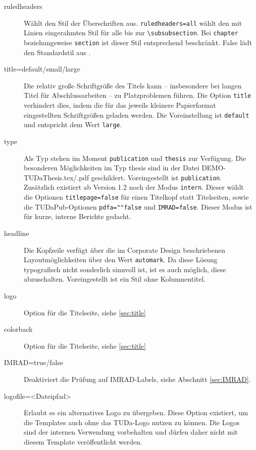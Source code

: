 \documentclass[
	ngerman,%
	accentcolor=9c,%
]{tudapub}
\newcommand*{\code}[1]{\texttt{#1}}
\begin{document}
\begin{description}
	\item[ruledheaders] Wählt den Stil der Überschriften aus. \code{ruledheaders=all} wählt den mit Linien eingerahmten Stil für alle bis zur \verb+\subsubsection+. Bei \code{chapter} beziehungsweise \code{section} ist dieser Stil entsprechend beschränkt. False lädt den Standardstil aus \KOMAScript.

	\item[title=default/small/large] Die relativ große Schriftgröße des Titels kann – insbesondere bei langen Titel für Abschlussarbeiten – zu Platzproblemen führen. Die Option \code{title} verhindert dies, indem die für das jeweils kleinere Papierformat eingestellten Schriftgrößen geladen werden. Die Voreinstellung ist \code{default} und entspricht dem Wert \code{large}.

	\item[type] Als Typ stehen im Moment \code{publication} und \code{thesis} zur Verfügung. Die besonderen Möglichkeiten im Typ thesis sind in der Datei DEMO-TUDaThesis.tex/.pdf geschildert. Voreingestellt ist \code{publication}.
	      Zusätzlich existiert ab Version 1.2 noch der Modus \code{intern}. Dieser wählt die Optionen \code{titlepage=false} für einen Titelkopf statt Titelseiten, sowie die TUDaPub-Optionen \code{pdfa=""false} und \code{IMRAD=false}. Dieser Modus ist für kurze, interne Berichte gedacht.

	\item[headline] Die Kopfzeile verfügt über die im Corporate Design beschriebenen Layoutmöglichkeiten über den Wert \code{automark}. Da diese Lösung typografisch nicht sonderlich sinnvoll ist, ist es auch möglich, diese abzuschalten. Voreingestellt ist ein Stil ohne Kolumnentitel.

	\item[logo] Option für die Titelseite, siehe \ref{sec:title}

	\item[colorback] Option für die Titelseite, siehe \ref{sec:title}

	\item[IMRAD=true/false] Deaktiviert die Prüfung auf IMRAD-Labels, siehe Abschnitt \ref{sec:IMRAD}.

	\item[logofile=<Dateipfad>] Erlaubt es ein alternatives Logo zu übergeben. Diese Option existiert, um die Templates auch ohne das TUDa-Logo nutzen zu können. Die Logos sind der internen Verwendung vorbehalten und dürfen daher nicht mit diesem Template veröffentlicht werden.
\end{description}
\end{document}
